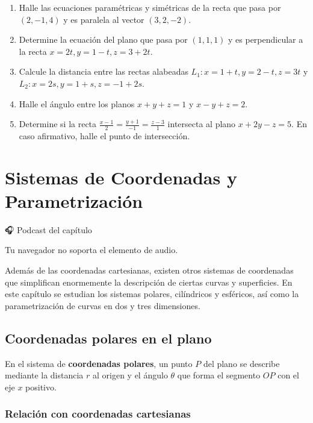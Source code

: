 \documentclass[
]{book}
\providecommand{\tightlist}{%
  \setlength{\itemsep}{0pt}\setlength{\parskip}{0pt}}
\begin{document}
\begin{enumerate}
\def\labelenumi{\arabic{enumi}.}
\tightlist
\item
  Halle las ecuaciones paramétricas y simétricas de la recta que pasa por \((2, -1, 4)\) y es paralela al vector \((3, 2, -2)\).
\item
  Determine la ecuación del plano que pasa por \((1, 1, 1)\) y es perpendicular a la recta \(x = 2t, y = 1 - t, z = 3 + 2t\).
\item
  Calcule la distancia entre las rectas alabeadas \(L_1: x = 1 + t, y = 2 - t, z = 3t\) y \(L_2: x = 2s, y = 1 + s, z = -1 + 2s\).
\item
  Halle el ángulo entre los planos \(x + y + z = 1\) y \(x - y + z = 2\).
\item
  Determine si la recta \(\frac{x-1}{2} = \frac{y+1}{-1} = \frac{z-3}{1}\) intersecta al plano \(x + 2y - z = 5\). En caso afirmativo, halle el punto de intersección.
\end{enumerate}

\chapter{Sistemas de Coordenadas y Parametrización}\label{coordenadas}

🎧 Podcast del capítulo

Tu navegador no soporta el elemento de audio.

Además de las coordenadas cartesianas, existen otros sistemas de coordenadas que simplifican enormemente la descripción de ciertas curvas y superficies. En este capítulo se estudian los sistemas polares, cilíndricos y esféricos, así como la parametrización de curvas en dos y tres dimensiones.

\section{Coordenadas polares en el plano}\label{coordenadas-polares-en-el-plano}

En el sistema de \textbf{coordenadas polares}, un punto \(P\) del plano se describe mediante la distancia \(r\) al origen y el ángulo \(\theta\) que forma el segmento \(OP\) con el eje \(x\) positivo.

\subsection{Relación con coordenadas cartesianas}\label{relaciuxf3n-con-coordenadas-cartesianas}
\end{document}
